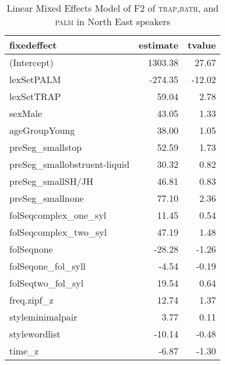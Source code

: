 \begin{table}[ht]
\centering
\begin{tabular}{lrr}
  \hline
fixedeffect & estimate & tvalue \\ 
  \hline
(Intercept) & 1303.38 & 27.67 \\ 
  lexSetPALM & -274.35 & -12.02 \\ 
  lexSetTRAP & 59.04 & 2.78 \\ 
  sexMale & 43.05 & 1.33 \\ 
  ageGroupYoung & 38.00 & 1.05 \\ 
  preSeg\_smallstop & 52.59 & 1.73 \\ 
  preSeg\_smallobstruent-liquid & 30.32 & 0.82 \\ 
  preSeg\_smallSH/JH & 46.81 & 0.83 \\ 
  preSeg\_smallnone & 77.10 & 2.36 \\ 
  folSeqcomplex\_one\_syl & 11.45 & 0.54 \\ 
  folSeqcomplex\_two\_syl & 47.19 & 1.48 \\ 
  folSeqnone & -28.28 & -1.26 \\ 
  folSeqone\_fol\_syll & -4.54 & -0.19 \\ 
  folSeqtwo\_fol\_syl & 19.54 & 0.64 \\ 
  freq.zipf\_z & 12.74 & 1.37 \\ 
  styleminimalpair & 3.77 & 0.11 \\ 
  stylewordlist & -10.14 & -0.48 \\ 
  time\_z & -6.87 & -1.30 \\ 
   \hline
\end{tabular}
\caption{Linear Mixed Effects Model of F2 of \textsc{trap},\textsc{bath}, and \textsc{palm} in North East speakers \label{tbl:TBF1NE}} 
\end{table}
